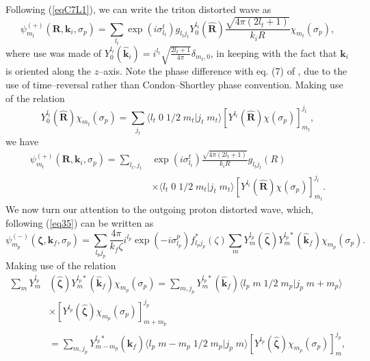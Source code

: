Following (\ref{eqC7L1}), we can write the triton distorted wave as
\begin{equation}\label{eq88}
    \psi^{(+)}_{m_t}(\mathbf{R},\mathbf{k}_i,\sigma_p)=\sum_{l_t}\exp\left(i\sigma_{l_t}^t\right)g_{l_tj_t}Y_0^{l_t}
    (\hat{\mathbf{R}})\frac{\sqrt{4\pi(2l_t+1)}}{k_iR}\chi_{m_t}(\sigma_p),
\end{equation}
where use was made of $Y_0^{l_t}(\hat{\mathbf{k}}_i)=i^{l_t}\sqrt{\tfrac{2l_t+1}{4\pi}}\delta_{m_t,0}$, in keeping with the fact that $\mathbf{k}_i$ is oriented along the $z$--axis. Note the phase difference with eq. (7) of \cite{Bayman:71}, due to the use of time--reversal rather than Condon--Shortley phase convention. Making use of the relation
\begin{equation}\label{eq89}
    Y_0^{l_t}(\hat{\mathbf{R}})\chi_{m_t}(\sigma_p)=\sum_{j_t}\langle l_t \;0\;1/2\;m_t|j_t\;m_t\rangle \left[Y^{l_t}(\hat{\mathbf{R}})\chi(\sigma_p)\right]^{j_t}_{m_t},
\end{equation}
we have
\begin{equation}\label{eq90}
\begin{split}
    \psi^{(+)}_{m_t}(\mathbf{R},\mathbf{k}_i,\sigma_p)=\sum_{l_t,j_t}&\exp\left(i\sigma_{l_t}^t\right)
    \frac{\sqrt{4\pi(2l_t+1)}}{k_iR}g_{l_tj_t}(R)\\
    &\times\langle l_t \;0\;1/2\;m_t|j_t\;m_t\rangle \left[Y^{l_t}(\hat{\mathbf{R}})\chi(\sigma_p)\right]^{j_t}_{m_t}.
\end{split}
\end{equation}
We now turn our attention to the outgoing proton distorted wave, which, following (\ref{eq35}) can be written as
\begin{equation}\label{eq91}
    \psi^{(-)}_{m_p}(\boldsymbol{\zeta},\mathbf{k}_f,\sigma_p)=\sum_{l_pj_p}\frac{4\pi}{k_f\zeta}i^{l_p}
    \exp\left(-i\sigma_{l_p}^p\right)f_{l_pj_p}^*(\zeta)\sum_m Y_m^{l_p}
    (\hat{\boldsymbol{\zeta}})Y_m^{l_p*}
    (\hat{\mathbf{k}}_f)\chi_{m_p}(\sigma_p).
\end{equation}
Making use of the relation
\begin{equation}\label{eq92}
\begin{split}
\sum_m Y_m^{l_p}&
    (\hat{\boldsymbol{\zeta}})Y_m^{l_p*}
    (\hat{\mathbf{k}}_f)\chi_{m_p}(\sigma_p)=\sum_{m,j_p} Y_m^{l_p*}
    (\hat{\mathbf{k}}_f)\langle l_p \;m\;1/2\;m_p|j_p\;m+m_p\rangle \\
    &\times \left[Y^{l_p}
    (\hat{\boldsymbol{\zeta}})\chi_{m_p}(\sigma_p)\right]^{j_p}_{m+m_p}\\
    &=\sum_{m,j_p} Y_{m-m_p}^{l_p*}
    (\hat{\mathbf{k}}_f)\langle l_p \;m-m_p\;1/2\;m_p|j_p\;m\rangle \left[Y^{l_p}
    (\hat{\boldsymbol{\zeta}})\chi_{m_p}(\sigma_p)\right]^{j_p}_{m},
\end{split}
\end{equation}
